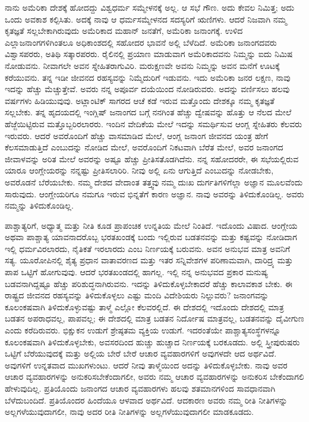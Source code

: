 ನಾನು ಅಮೆರಿಕಾ ದೇಶಕ್ಕೆ ಹೋದದ್ದು ವಿಶ್ವಧರ್ಮ ಸಮ್ಮೇಳನಕ್ಕೆ ಅಲ್ಲ. ಆ ಸಭೆ ಗೌಣ. ಅದು ಕೇವಲ ನಿಮಿತ್ತ; ಅದು ಒಂದು ಅವಕಾಶ ಕಲ್ಪಿಸಿತು. ಅದಕ್ಕೆ ನಾವು ಆ ಧರ್ಮಸಮ್ಮೇಳನದ ಸದಸ್ಯರಿಗೆ ಋಣಿಗಳು. ಆದರೆ ನಿಜವಾಗಿ ನಮ್ಮ ಕೃತಜ್ಞತೆ ಸಲ್ಲಬೇಕಾಗಿರುವುದು ಅಮೆರಿಕಾದ ಮಹಾನ್​ ಜನತೆಗೆ, ಅಮೆರಿಕಾ ಜನಾಂಗಕ್ಕೆ. ಉಳಿದ ಎಲ್ಲಾ\break ಜನಾಂಗಗಳಿಗಿಂತಲೂ ಅಧಿಕಾಂಶದಲ್ಲಿ ಸಹೋದರ ಭಾವನೆ ಅಲ್ಲಿ ಬೆಳೆದಿದೆ. ಅಮೆರಿಕಾ ಜನಾಂಗದವರು ವಿಶ್ವಾಸಪರರು, ಅತಿಥಿ ಸತ್ಕಾರಪರರು. ರೈಲಿನಲ್ಲಿ ಪ್ರಯಾಣ ಮಾಡುವಾಗ ಅಮೆರಿಕಾದವನು ನಿಮ್ಮನ್ನು ಐದು ನಿಮಿಷ ನೋಡುವನು. ನೀವಾಗಲೇ ಅವನ ಸ್ನೇಹಿತರಾಗುವಿರಿ. ಮರುಕ್ಷಣವೇ ಅವನು ನಿಮ್ಮನ್ನು ಅವನ ಮನೆಗೆ ಊಟಕ್ಕೆ ಕರೆಯುವನು. ತನ್ನ ಇಡೀ ಜೀವನದ ರಹಸ್ಯವನ್ನು ನಿಮ್ಮೆದುರಿಗೆ ಇಡುವನು. ಇದು ಅಮೆರಿಕಾ ಜನರ ಲಕ್ಷಣ, ನಾವು ಇದನ್ನು ಹೆಚ್ಚು ಮೆಚ್ಚುತ್ತೇವೆ. ಅವರು ನನ್ನ ಅಪೂರ್ವ ದಯೆಯಿಂದ ನೋಡಿರುವರು. ಅದನ್ನು ವರ್ಣಿಸಲು ಹಲವು ವರ್ಷಗಳು ಹಿಡಿಯುವುವು. ಅಟ್ಲಾಂಟಿಕ್​ ಸಾಗರದ ಆಚೆ ಕಡೆ ಇರುವ ಮತ್ತೊಂದು ದೇಶಕ್ಕೂ ನಮ್ಮ ಕೃತಜ್ಞತೆ ಸಲ್ಲಬೇಕು. ತನ್ನ ಹೃದಯದಲ್ಲಿ ಇಂಗ್ಲಿಷ್​ ಜನಾಂಗದ ಬಗ್ಗೆ ನನಗಿಂತ ಹೆಚ್ಚು ದ್ವೇಷವನ್ನು ಹೊತ್ತು ಆ ನೆಲದ ಮೇಲೆ ಹೆಜ್ಜೆಯಿಟ್ಟಿರುವ ಮತ್ತೊಬ್ಬರಿರಲಾರರು. ಇಂದಿನ ವೇದಿಕೆಯ ಮೇಲೆ ಇದನ್ನು ಸಮರ್ಥಿಸುವ ಆಂಗ್ಲ ಸ್ನೇಹಿತರು ಕೆಲವರು ಇರುವರು. ಆದರೆ ಅವರೊಂದಿಗೆ ಹೆಚ್ಚು ವಾಸಮಾಡಿದ ಮೇಲೆ, ಆಂಗ್ಲ ಜನಾಂಗ ಜೀವನದ ಯಂತ್ರ ಹೇಗೆ ಕೆಲಸಮಾಡುತ್ತಿದೆ ಎಂಬುದನ್ನು ನೋಡಿದ ಮೇಲೆ, ಅವರೊಂದಿಗೆ ನಿಕಟವಾಗಿ ಬೆರೆತ ಮೇಲೆ, ಅವರ ಜನಾಂಗದ ಜೀವಾಳವನ್ನು ಅರಿತ ಮೇಲೆ ಅವರನ್ನು ಅಷ್ಟೂ ಹೆಚ್ಚು ಪ್ರೀತಿಸತೊಡಗಿದೆನು. ನನ್ನ ಸಹೋದರರೇ, ಈ ಸಭೆಯಲ್ಲಿರುವ ಯಾರೂ ಆಂಗ್ಲೇಯರನ್ನು ನನ್ನಷ್ಟು ಪ್ರೀತಿಸಲಾರಿರಿ. ನೀವು ಅಲ್ಲಿ ಏನು ಆಗುತ್ತಿದೆ ಎಂಬುದನ್ನು ನೋಡಬೇಕು, ಅವರೊಡನೆ ಬೆರೆಯಬೇಕು. ನಮ್ಮ ದೇಶದ ವೇದಾಂತ ತತ್ತ್ವವು ನಮ್ಮ ದುಃಖ ದುರ್ಗತಿಗಳಿಗೆಲ್ಲಾ ಅಜ್ಞಾನ ಮೂಲವೆಂದು ಸಾರುವುದು. ಆಂಗ್ಲೇಯರಿಗೂ ನಮಗೂ ಇರುವ ಭಿನ್ನತೆಗೆ ಕಾರಣ ಅಜ್ಞಾನ. ನಾವು ಅವರನ್ನು ತಿಳಿದುಕೊಂಡಿಲ್ಲ. ಅವರು ನಮ್ಮನ್ನು ತಿಳಿದುಕೊಂಡಿಲ್ಲ.

ಪಾಶ್ಚಾತ್ಯರಿಗೆ, ಅಧ್ಯಾತ್ಮ ಮತ್ತು ನೀತಿ ಕೂಡ ಪ್ರಾಪಂಚಿಕ ಉನ್ನತಿಯ ಮೇಲೆ ನಿಂತಿದೆ. ಇದೊಂದು ವಿಷಾದ. ಆಂಗ್ಲೇಯ ಅಥವಾ ಪಾಶ್ಚಾತ್ಯ ಯಾವನಾದರೊಬ್ಬ ಭರತಖಂಡಕ್ಕೆ ಬಂದು ಇಲ್ಲಿರುವ ಬಡತನವನ್ನು ಮತ್ತು ಕಷ್ಟವನ್ನು ನೋಡಿದಾಗ ಇಲ್ಲಿ ಧರ್ಮವಿರಲಾರದು, ನೈತಿಕತೆ ಇರಲಾರದು ಎಂಬ ನಿರ್ಣಯಕ್ಕೆ ಬರುವನು. ಅವನ ಅನುಭವ ಮಾತ್ರ ಅವನಿಗೆ ಸತ್ಯ. ಯೂರೋಪಿನಲ್ಲಿ ಶೈತ್ಯ ಪ್ರಧಾನ ವಾತಾವರಣದ ಮತ್ತು ಇತರ ಸನ್ನಿವೇಶಗಳ ಪರಿಣಾಮವಾಗಿ, ದಾರಿದ್ರ್ಯ ಮತ್ತು ಪಾಪ ಒಟ್ಟಿಗೆ ಹೋಗುವುವು. ಆದರೆ ಭರತಖಂಡದಲ್ಲಿ ಹಾಗಲ್ಲ. ಇಲ್ಲಿ ನನ್ನ ಅನುಭವದ ಪ್ರಕಾರ ಮನುಷ್ಯ ಬಡವನಾಗಿದ್ದಷ್ಟೂ ಹೆಚ್ಚು ಪರಿಶುದ್ಧನಾಗಿರುವನು. ಇದನ್ನು ತಿಳಿದುಕೊಳ್ಳಬೇಕಾದರೆ ಹೆಚ್ಚು ಕಾಲಾವಕಾಶ ಬೇಕು. ಈ ರಾಷ್ಟ್ರದ ಜೀವನದ ರಹಸ್ಯವನ್ನು ತಿಳಿದುಕೊಳ್ಳಲು ಎಷ್ಟು ಮಂದಿ ವಿದೇಶಿಯರು ನಿಲ್ಲುವರು? ಜನಾಂಗವನ್ನು ಕೂಲಂಕಷವಾಗಿ ತಿಳಿದುಕೊಳ್ಳುವಷ್ಟು ತಾಳ್ಮೆ ಎಲ್ಲೋ ಕೆಲವರಲ್ಲಿದೆ. ಈ ದೇಶದಲ್ಲಿ ಇದೊಂದು ದೇಶದಲ್ಲಿ ಮಾತ್ರ ಬಡತನ ಅಪರಾಧವಲ್ಲ, ಪಾಪವಲ್ಲ; ಈ ದೇಶದಲ್ಲಿ ಮಾತ್ರ ಬಡತನ ನಿರ್ದೋಷ ಮಾತ್ರವಲ್ಲ, ಬಡತನವನ್ನು ದೈವೀಗುಣ ಎಂದು ಕರೆದಿರುವರು. ಭಿಕ್ಷುಕನ ಉಡುಗೆ ಶ್ರೇಷ್ಠತಮ ವ್ಯಕ್ತಿಯ ಉಡುಗೆ. ಇದರಂತೆಯೇ ಪಾಶ್ಚಾತ್ಯ\break ಸಂಸ್ಥೆಗಳನ್ನೂ ಕೂಲಂಕಷವಾಗಿ ತಿಳಿದುಕೊಳ್ಳಬೇಕು, ಅವಸರದಿಂದ ಹುಚ್ಚು ಹುಚ್ಚಾದ ನಿರ್ಣಯಕ್ಕೆ ಬರಕೂಡದು. ಅಲ್ಲಿ ಸ್ತ್ರೀಪುರುಷರು ಒಟ್ಟಿಗೆ ಬೆರೆಯುವುದಕ್ಕೆ ಮತ್ತು ಅಲ್ಲಿಯ ಬೇರೆ ಬೇರೆ ಆಚಾರ ವ್ಯವಹಾರಗಳಿಗೆ ಅವುಗಳದೇ ಆದ ಅರ್ಥವಿದೆ. ಅವುಗಳಿಗೆ ಉನ್ನತವಾದ ಮುಖಗಳುಂಟು. ಆದರೆ ನೀವು ತಾಳ್ಮೆಯಿಂದ ಅದನ್ನು ತಿಳಿದುಕೊಳ್ಳಬೇಕು. ನಾವು ಅವರ ಆಚಾರ ವ್ಯವಹಾರಗಳನ್ನು ಅನುಕರಿಸಬೇಕೆಂದಾಗಲೀ, ಅವರು ನಮ್ಮ ಆಚಾರ ವ್ಯವಹಾರಗಳನ್ನು ಅನುಕರಿಸ ಬೇಕೆಂದಾಗಲಿ ಹೇಳುವುದಿಲ್ಲ. ಪ್ರತಿಯೊಂದು ಜನಾಂಗದ ಆಚಾರ ವ್ಯವಹಾರಗಳು ಹಲವು ಶತಮಾನಗಳಿಂದ ಸಾವಧಾನವಾಗಿ ಬೆಳೆದುಬಂದಿದೆ. ಪ್ರತಿಯೊಂದರ ಹಿಂದೆಯೂ ಆಳವಾದ ಅರ್ಥವಿದೆ. ಆದಕಾರಣ ಅವರು ನಮ್ಮ ರೀತಿ ನೀತಿಗಳನ್ನು ಅಲ್ಲಗಳೆಯುವುದಾಗಲೀ, ನಾವು ಅದರ ರೀತಿ ನೀತಿಗಳನ್ನು ಅಲ್ಲಗಳೆಯುವುದಾಗಲೀ ಮಾಡಕೂಡದು.

